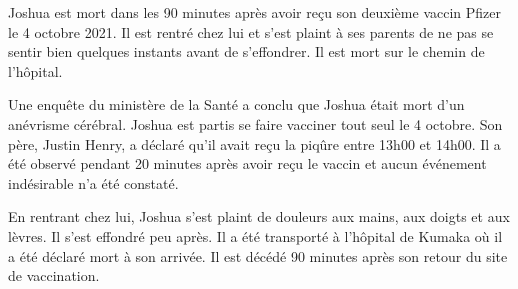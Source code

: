 Joshua est mort dans les 90 minutes après avoir reçu son deuxième vaccin Pfizer
le 4 octobre 2021. Il est rentré chez lui et s'est plaint à ses parents de ne
pas se sentir bien quelques instants avant de s'effondrer. Il est mort sur le
chemin de l'hôpital.

Une enquête du ministère de la Santé a conclu que Joshua était mort d'un
anévrisme cérébral. Joshua est partis se faire vacciner tout seul le 4
octobre. Son père, Justin Henry, a déclaré qu'il avait reçu la piqûre entre
13h00 et 14h00. Il a été observé pendant 20 minutes après avoir reçu le vaccin
et aucun événement indésirable n'a été constaté.

En rentrant chez lui, Joshua s'est plaint de douleurs aux mains, aux doigts et
aux lèvres. Il s'est effondré peu après. Il a été transporté à l'hôpital de
Kumaka où il a été déclaré mort à son arrivée. Il est décédé 90 minutes après
son retour du site de vaccination.

